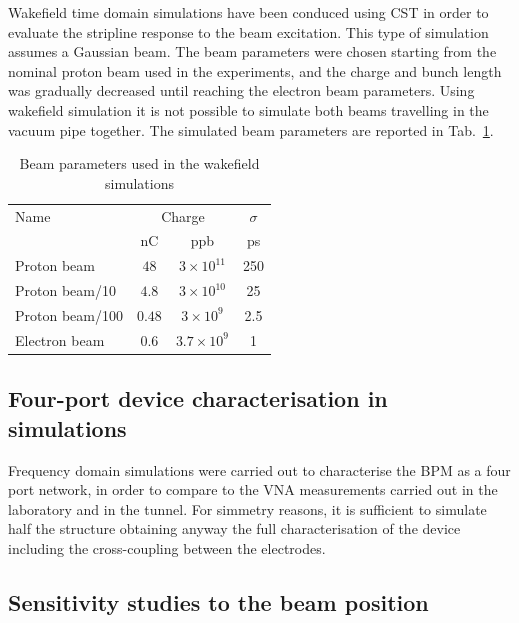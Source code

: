 Wakefield time domain simulations have been conduced using CST in order to evaluate the stripline response to the beam excitation. This type of simulation assumes a Gaussian beam. The beam parameters were chosen starting from the nominal proton beam used in the experiments, and the charge and bunch length was gradually decreased until reaching the electron beam parameters. Using wakefield simulation it is not possible to simulate both beams travelling in the vacuum pipe together. The simulated beam parameters are reported in Tab.~\ref{beam_param_wak:tab}.

\begin{table}[ht]
  \centering
    \begin{tabular}{l c c c}
    \toprule
    Name  & \multicolumn{2}{c}{Charge} & $\sigma$\\
          & nC & ppb & ps\\
    \midrule
    Proton beam								& $48$	  & $3\times10^{11}$	& 250	\\
    Proton beam/10						& $4.8$	  & $3\times10^{10}$	& 25	\\
    Proton beam/100						& $0.48$  & $3\times10^{9}$		& 2.5	\\
    Electron beam							& $0.6$	  & $3.7\times10^{9}$	& 1		\\
    \bottomrule
    \end{tabular}
  \caption{Beam parameters used in the wakefield simulations} \label{beam_param_wak:tab}
\end{table}




\subsection[Four-port device characterisation in simulations]{Four-port device characterisation in simulations}

Frequency domain simulations were carried out to characterise the BPM as a four port network, in order to compare to the VNA measurements carried out in the laboratory and in the tunnel. For simmetry reasons, it is sufficient to simulate half the structure obtaining anyway the full characterisation of the device including the cross-coupling between the electrodes.





\subsection[Sensitivity studies to the beam position]{Sensitivity studies to the beam position}

